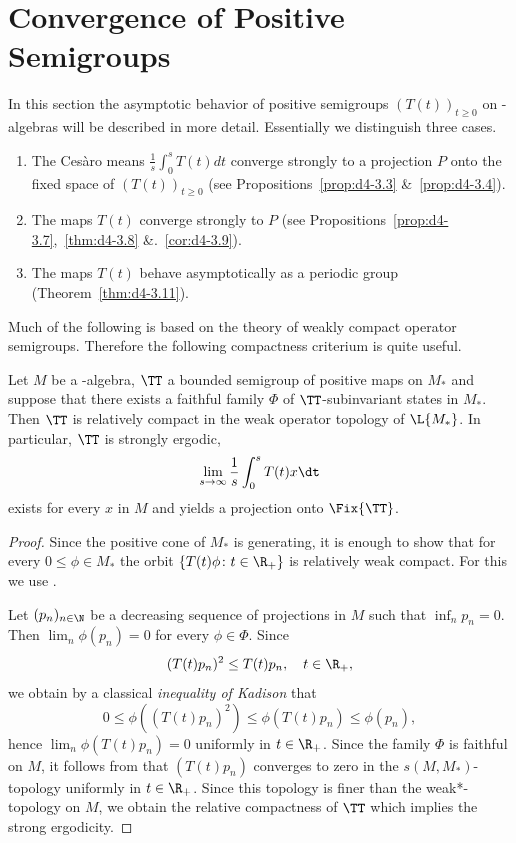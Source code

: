 \section{Convergence of Positive Semigroups}\label{sec:d4-3}
In this section the asymptotic behavior of positive semigroups $(T(t))_{t \geq 0}$ on \WA-algebras will be described in more detail.
Essentially we distinguish three cases.
\begin{enumerate}[\upshape (i), wide, labelindent=.25em]
\item
The Cesàro means $\frac{1}{s}\int_{0}^{s} T(t)dt$ converge strongly to a projection $P$ onto the fixed space of\/ $(T(t))_{t \geq 0}$ (see Propositions~\ref{prop:d4-3.3} \&~\ref{prop:d4-3.4}).

\item
The maps $T(t)$ converge strongly to $P$ (see Propositions~\ref{prop:d4-3.7},~\ref{thm:d4-3.8} \&.~\ref{cor:d4-3.9}).

\item
The maps $T(t)$ behave asymptotically as a periodic group (Theorem~\ref{thm:d4-3.11}).
\end{enumerate}
Much of the following is based on the theory of weakly compact operator semigroups.
Therefore the following compactness criterium is quite useful. 
\begin{proposition}\label{prop:d4-3.1}
Let $M$ be a \WA-algebra, $\TT$ a bounded semigroup of positive maps on $M_{*}$ and suppose that there exists a faithful family $\Phi$ of\/ $\TT$-subinvariant states in $M_{*}$.
Then $\TT$ is relatively compact in the weak operator topology of\/ $ \L{M_{*}} $.
In particular, $\TT$ is strongly ergodic, \ie 
%
\[
	\lim_{s \to \infty} \frac{1}{s}\int_{0}^{s} T(t)x \dt
\]
%
exists for every $x$ in $M$ and yields a projection onto $\Fix{\TT}$.
\end{proposition}
%
\begin{proof}
Since the positive cone of\/ $M_{*}$ is generating, it is enough to show that for every $0 \leq \phi \in M_{*}$ the orbit $\{T(t)\phi \colon t \in \R_{+}\}$ is relatively weak compact.
For this we use \textcite[Theorem III.5.4.\,(iii)]{takesaki:1979}.

Let $(p_{n})_{n \in \N}$ be a decreasing sequence of projections in $M$ such that $\inf_{n} p_{n} = 0$.
Then $\lim_{n}\phi(p_{n}) = 0$ for every $\phi \in \Phi$.
Since
\[
	(T(t)p_{n})^2 \leq T(t)p_{n}, \quad t \in \R_{+},
\]
we obtain by a classical \emph{inequality of Kadison} that
\[
0 \leq \phi((T(t)p_{n})^2) \leq \phi(T(t)p_{n}) \leq \phi(p_{n}),
\]
hence $\lim_{n}\phi(T(t)p_{n}) = 0$ uniformly in $t \in \R_{+}$.
Since the family $\Phi$ is faithful on $M$, it follows from \textcite[Proposition III.5.3]{takesaki:1979} that $(T(t)p_{n})$ converges to zero in the $s(M,M_{*})$-topology uniformly in $t \in \R_{+}$.
Since this topology is finer than the weak*-topology on $M$, we obtain the relative compactness of\/ $\TT$ which implies the strong ergodicity.
\end{proof}
